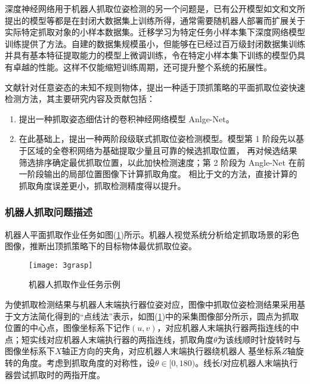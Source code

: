 \documentclass[no-math, withoutpreface]{YangThesis}
\begin{document}
深度神经网络用于机器人抓取位姿检测的另一个问题是，已有公开模型如文\cite{bibb7}和文\cite{bibb11}所提出的模型等都是在封闭大数据集上训练所得，通常需要随机器人部署而扩展关于实际特定抓取对象的小样本数据集。迁移学习为特定任务小样本集下深度网络模型训练提供了方法。自建的数据集规模虽小，但能够在已经过百万级封闭数据集训练并具有基本特征提取能力的模型上微调训练，令在特定小样本集下训练的模型仍具有卓越的性能。这样不仅能缩短训练周期，还可提升整个系统的拓展性。

文献\cite{bib:three}针对任意姿态的未知不规则物体，提出一种适于顶抓策略的平面抓取位姿快速检测方法，其主要研究内容及贡献包括：

\begin{enumerate}[fullwidth, label=(\arabic*), itemindent=2em]
\item 提出一种抓取姿态细估计的卷积神经网络模型 Anlge-Net。

\item 在此基础上，提出一种两阶段级联式抓取位姿检测模型。模型第 1 阶段先以基于区域的全卷积网络\cite{bibb12}为基础提取少量且可靠的候选抓取位置， 再对候选结果筛选排序确定最优抓取位置，以此加快检测速度；第 2 阶段为 Angle-Net 在前一阶段输出的局部位置图像下计算抓取角度。 相比于文\cite{bibb9}的方法，直接计算的抓取角度误差更小，抓取检测精度得以提升。
\end{enumerate}

\subsubsection{机器人抓取问题描述}

机器人平面抓取作业任务如图(\ref{figgrasp})所示。机器人视觉系统分析给定抓取场景的彩色图像，推断出顶抓策略下的目标物体最优抓取位姿。

\begin{figure}[!htbp]
	\centering
	\texttt{[image: 3grasp]}
	\caption{机器人抓取作业任务示例}
     \label{figgrasp}
\end{figure}

为使抓取检测结果与机器人末端执行器位姿对应，图像中抓取位姿检测结果采用基于文\cite{bibb4}方法简化得到的“点线法”表示，如图(\ref{figgrasp})中的采集图像部分所示，圆点为抓取位置的中心点，图像坐标系下记作$(u, v)$，对应机器人末端执行器两指连线的中点；短实线对应机器人末端执行器的两指连线，抓取角度$\theta$为该线顺时针旋转时与图像坐标系下$X$轴正方向的夹角，对应机器人末端执行器绕机器人 基坐标系$Z$轴旋转的角度。考虑到抓取角度的对称性，设$\theta\in [0, 180)$。线长$l$对应机器人末端执行器尝试抓取时的两指开度。
\end{document}

